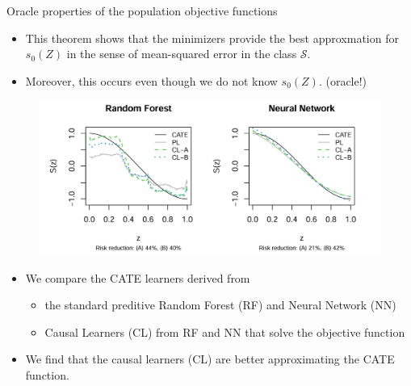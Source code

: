 \documentclass[xcolor=svgnames,aspectratio=169]{beamer}
\newcommand{\E}{\mathbb{E}}
\begin{document}
\begin{frame}{Oracle properties of the population objective functions}
    \begin{itemize}
        \begin{tcolorbox}[colframe=Cyan,title=Theorem 4]
        \begin{itemize}
            \item Suppose $Y, b(Z), s(Z), w(Z) \in L^2$ (2乗可積分).
            \item Then, the expectation of the loss functions can be decomposed 
            \begin{align*}
                &\E[w(Z)\{Y-b(Z)-(D-p(Z))s(Z)\}^2]=\E[(s_0(Z)-s(Z))^2]+C_{ib} \\
                &\E[(H(Y-b(Z)-s(Z)))^2]=\E[(s_0(Z)-s(Z))^2]+C_{2b}
            \end{align*}
            where $C_{1b}=\E[w(Z)(\tilde{b}_0(Z)-b(Z))^2]+C_1, C_{1b}=\E[w(Z)(\bar{b}_0(Z)-b(Z))^2]+C_2$
        \end{itemize}
    \end{tcolorbox}
    \item This theorem shows that the minimizers provide the best approxmation for $s_0(Z)$ in the sense of mean-squared error in the class $\mathcal{S} $.
    \item Moreover, this occurs even though we do not know $s_0(Z)$. (oracle!)
    \end{itemize}
\end{frame}

\begin{frame}
    \begin{figure}
        \includegraphics[width=1.5\textwidth, height=0.6\textheight, keepaspectratio]{PLvsCL(RF,NN).png}
    \end{figure}
    \begin{itemize}
        \item We compare the CATE learners derived from 
        \begin{itemize}
            \item the standard preditive Random Forest (RF) and Neural Network (NN)
            \item Causal Learners (CL) from RF and NN that solve the objective function
        \end{itemize}
        \item We find that the causal learners (CL) are better approximating the CATE function.
    \end{itemize}
\end{frame}
\end{document}
